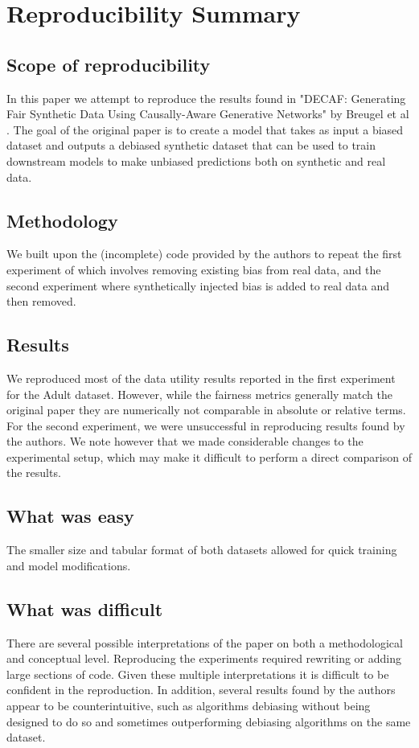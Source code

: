 \section{Reproducibility Summary}

\subsection{Scope of reproducibility}
In this paper we attempt to reproduce the results found in "DECAF: Generating Fair Synthetic Data Using Causally-Aware Generative Networks" by Breugel et al \cite{DBLP:conf/nips/BreugelKBS21}. The goal of the original paper is to create a model that takes as input a biased dataset and outputs a debiased synthetic dataset that can be used to train downstream models to make unbiased predictions both on synthetic and real data.

\subsection{Methodology}
We built upon the (incomplete) code provided by the authors to repeat the first experiment of \cite{DBLP:conf/nips/BreugelKBS21} which involves removing existing bias from real data, and the second experiment where synthetically injected bias is added to real data and then removed.

\subsection{Results}
We reproduced most of the data utility results reported in the first experiment for the Adult dataset. However, while the fairness metrics generally match the original paper they are numerically not comparable in absolute or relative terms. For the second experiment, we were unsuccessful in reproducing results found by the authors. We note however that we made considerable changes to the experimental setup, which may make it difficult to perform a direct comparison of the results. 
    
\subsection{What was easy}
The smaller size and tabular format of both datasets allowed for quick training and model modifications.

\subsection{What was difficult}
There are several possible interpretations of the paper on both a methodological and conceptual level. Reproducing the experiments required rewriting or adding large sections of code. Given these multiple interpretations it is difficult to be confident in the reproduction. In addition, several results found by the authors appear to be counterintuitive, such as algorithms debiasing without being designed to do so and sometimes outperforming debiasing algorithms on the same dataset.


